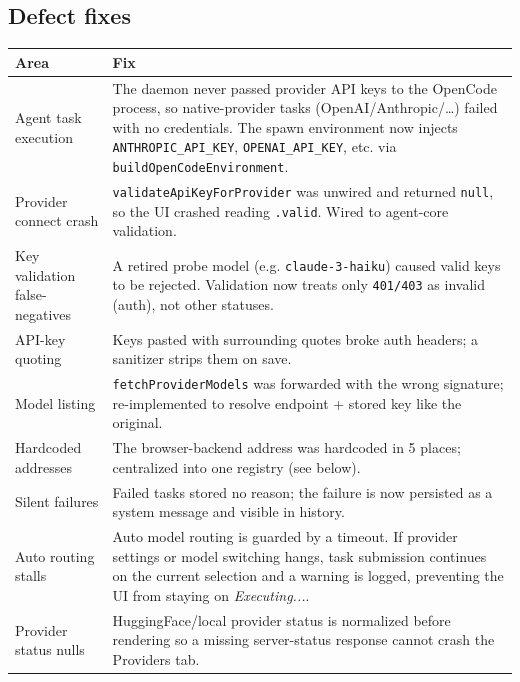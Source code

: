 \documentclass[11pt,a4paper]{article}
\begin{document}
\subsection{Defect fixes}
\begin{longtable}{p{} p{}}
\toprule
\textbf{Area} & \textbf{Fix} \\
\midrule
\endhead
Agent task execution & The daemon never passed provider API keys to the OpenCode
process, so native-provider tasks (OpenAI/Anthropic/\dots) failed with no
credentials. The spawn environment now injects \verb|ANTHROPIC_API_KEY|,
\verb|OPENAI_API_KEY|, etc. via \verb|buildOpenCodeEnvironment|. \\
Provider connect crash & \verb|validateApiKeyForProvider| was unwired and
returned \verb|null|, so the UI crashed reading \verb|.valid|. Wired to
agent-core validation. \\
Key validation false-negatives & A retired probe model (e.g.
\texttt{claude-3-haiku}) caused valid keys to be rejected. Validation now treats
only \verb|401/403| as invalid (auth), not other statuses. \\
API-key quoting & Keys pasted with surrounding quotes broke auth headers; a
sanitizer strips them on save. \\
Model listing & \verb|fetchProviderModels| was forwarded with the wrong
signature; re-implemented to resolve endpoint + stored key like the original. \\
Hardcoded addresses & The browser-backend address was hardcoded in 5 places;
centralized into one registry (see below). \\
Silent failures & Failed tasks stored no reason; the failure is now persisted as
a system message and visible in history. \\
Auto routing stalls & Auto model routing is guarded by a timeout. If provider
settings or model switching hangs, task submission continues on the current
selection and a warning is logged, preventing the UI from staying on
\emph{Executing...}. \\
Provider status nulls & HuggingFace/local provider status is normalized before
rendering so a missing server-status response cannot crash the Providers tab. \\
\bottomrule
\end{longtable}
\end{document}
